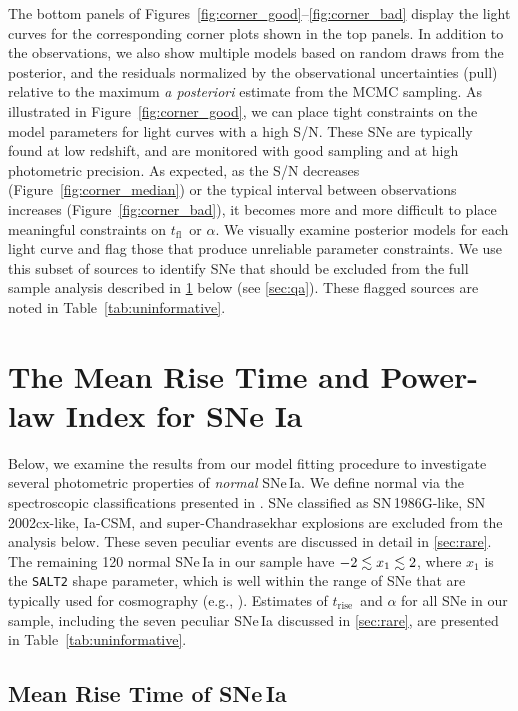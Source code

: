 \documentclass[twocolumn]{./aastex63}
\newcommand{\tfl}{$t_\mathrm{fl}$}
\newcommand{\trise}{$t_\mathrm{rise}$}
\begin{document}
The bottom panels of Figures~\ref{fig:corner_good}--\ref{fig:corner_bad}
display the light curves for the corresponding corner plots shown in the top
panels. In addition to the observations, we also show multiple models based on
random draws from the posterior, and the residuals normalized by the
observational uncertainties (pull) relative to the maximum \textit{a
posteriori} estimate from the MCMC sampling. As illustrated in
Figure~\ref{fig:corner_good}, we can place tight constraints on the model
parameters for light curves with a high S/N. These SNe are typically found at
low redshift, and are monitored with good sampling and at high photometric
precision. As expected, as the S/N decreases (Figure~\ref{fig:corner_median})
or the typical interval between observations increases
(Figure~\ref{fig:corner_bad}), it becomes more and more difficult to place
meaningful constraints on \tfl\ or $\alpha$. We visually examine posterior
models for each light curve and flag those that produce unreliable parameter
constraints. We use this subset of sources to identify SNe that should be
excluded from the full sample analysis described in \ref{sec:mean_parameters}
below (see \ref{sec:qa}). These flagged sources are noted in
Table~\ref{tab:uninformative}.

\section{The Mean Rise Time and Power-law Index for SNe
Ia}\label{sec:mean_parameters}

Below, we examine the results from our model fitting procedure to investigate
several photometric properties of \textit{normal} SNe\,Ia. We define normal
via the spectroscopic classifications presented in \citet{Yao19}. SNe
classified as SN\,1986G-like, SN\,2002cx-like, Ia-CSM, and super-Chandrasekhar
explosions are excluded from the analysis below. These seven peculiar events
are discussed in detail in \ref{sec:rare}. The remaining 120 normal SNe\,Ia in
our sample have $-2 \lesssim x_1 \lesssim 2$, where $x_1$ is the \texttt{SALT2} shape
parameter, which is well within the range of SNe that are typically used for
cosmography (e.g., \citealt{Scolnic18a}). Estimates of \trise\ and $\alpha$
for all SNe in our sample, including the seven peculiar SNe\,Ia discussed in
\ref{sec:rare}, are presented in Table~\ref{tab:uninformative}.

\subsection{Mean Rise Time of SNe\,Ia}\label{sec:mean_rise}
\end{document}
